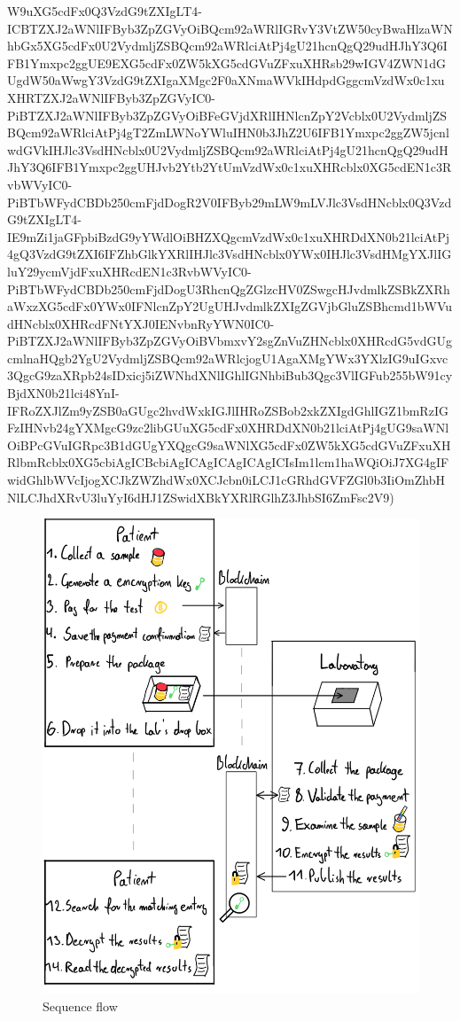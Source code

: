 \documentclass{article}
\begin{document}
W9uXG5cdFx0Q3VzdG9tZXIgLT4-ICBTZXJ2aWNlIFByb3ZpZGVyOiBQcm92aWRlIGRvY3VtZW50cyBwaHlzaWNhbGx5XG5cdFx0U2VydmljZSBQcm92aWRlciAtPj4gU21hcnQgQ29udHJhY3Q6IFB1Ymxpc2ggUE9EXG5cdFx0ZW5kXG5cdGVuZFxuXHRsb29wIGV4ZWN1dGUgdW50aWwgY3VzdG9tZXIgaXMgc2F0aXNmaWVkIHdpdGggcmVzdWx0c1xuXHRTZXJ2aWNlIFByb3ZpZGVyIC0-PiBTZXJ2aWNlIFByb3ZpZGVyOiBFeGVjdXRlIHNlcnZpY2Vcblx0U2VydmljZSBQcm92aWRlciAtPj4gT2ZmLWNoYWluIHN0b3JhZ2U6IFB1Ymxpc2ggZW5jcnlwdGVkIHJlc3VsdHNcblx0U2VydmljZSBQcm92aWRlciAtPj4gU21hcnQgQ29udHJhY3Q6IFB1Ymxpc2ggUHJvb2Ytb2YtUmVzdWx0c1xuXHRcblx0XG5cdEN1c3RvbWVyIC0-PiBTbWFydCBDb250cmFjdDogR2V0IFByb29mLW9mLVJlc3VsdHNcblx0Q3VzdG9tZXIgLT4-IE9mZi1jaGFpbiBzdG9yYWdlOiBHZXQgcmVzdWx0c1xuXHRDdXN0b21lciAtPj4gQ3VzdG9tZXI6IFZhbGlkYXRlIHJlc3VsdHNcblx0YWx0IHJlc3VsdHMgYXJlIGluY29ycmVjdFxuXHRcdEN1c3RvbWVyIC0-PiBTbWFydCBDb250cmFjdDogU3RhcnQgZGlzcHV0ZSwgcHJvdmlkZSBkZXRhaWxzXG5cdFx0YWx0IFNlcnZpY2UgUHJvdmlkZXIgZGVjbGluZSBhcmd1bWVudHNcblx0XHRcdFNtYXJ0IENvbnRyYWN0IC0-PiBTZXJ2aWNlIFByb3ZpZGVyOiBVbmxvY2sgZnVuZHNcblx0XHRcdG5vdGUgcmlnaHQgb2YgU2VydmljZSBQcm92aWRlcjogU1AgaXMgYWx3YXlzIG9uIGxvc3QgcG9zaXRpb24sIDxicj5iZWNhdXNlIGhlIGNhbiBub3Qgc3VlIGFub255bW91cyBjdXN0b21lci48YnI-IFRoZXJlZm9yZSB0aGUgc2hvdWxkIGJlIHRoZSBob2xkZXIgdGhlIGZ1bmRzIGFzIHNvb24gYXMgcG9zc2libGUuXG5cdFx0XHRDdXN0b21lciAtPj4gUG9saWNlOiBPcGVuIGRpc3B1dGUgYXQgcG9saWNlXG5cdFx0ZW5kXG5cdGVuZFxuXHRlbmRcblx0XG5cbiAgICBcbiAgICAgICAgICAgICIsIm1lcm1haWQiOiJ7XG4gIFwidGhlbWVcIjogXCJkZWZhdWx0XCJcbn0iLCJ1cGRhdGVFZGl0b3IiOmZhbHNlLCJhdXRvU3luYyI6dHJ1ZSwidXBkYXRlRGlhZ3JhbSI6ZmFsc2V9)
\begin{figure}[htbp]
\centerline{\includegraphics[width=\linewidth]{sequence-flow.png}}
\caption{Sequence flow}
\label{fig:sequence-flow}
\end{figure}
\end{document}
